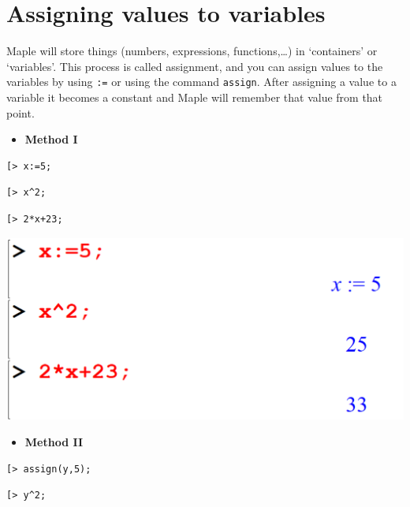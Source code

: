 \documentclass[
]{book}
\providecommand{\tightlist}{%
  \setlength{\itemsep}{0pt}\setlength{\parskip}{0pt}}
\theoremstyle{definition}
\theoremstyle{definition}
\theoremstyle{definition}
\theoremstyle{definition}
\theoremstyle{remark}
\begin{document}
\section{Assigning values to variables}\label{assigning-values-to-variables}

Maple will store things (numbers, expressions, functions,\ldots) in `containers' or `variables'.
This process is called assignment, and you can assign values to the variables by using \texttt{:=} or using the command \texttt{assign}. After assigning a value to a variable it becomes a constant and Maple will remember that value from that point.

\begin{itemize}
\tightlist
\item
  \textbf{Method I}
\end{itemize}

\begin{verbatim}
[> x:=5;
\end{verbatim}

\begin{verbatim}
[> x^2;
\end{verbatim}

\begin{verbatim}
[> 2*x+23;
\end{verbatim}

\includegraphics{figures/Lesson 1/fig56.png}

\begin{itemize}
\tightlist
\item
  \textbf{Method II}
\end{itemize}

\begin{verbatim}
[> assign(y,5);
\end{verbatim}

\begin{verbatim}
[> y^2;
\end{verbatim}
\end{document}
